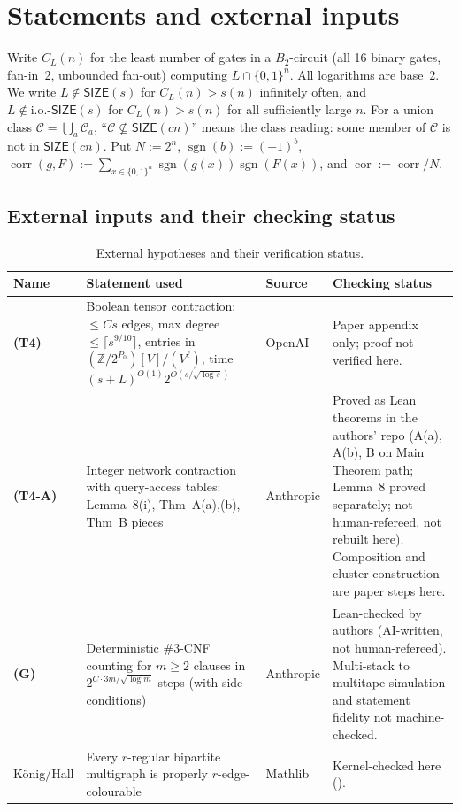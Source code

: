 \documentclass[11pt]{article}
\theoremstyle{definition}
\newcommand{\SIZE}{\mathsf{SIZE}}
\newcommand{\leanus}{\textunderscore\allowbreak}
\newcommand{\lean}[1]{\ifmmode\text{\ttfamily #1}\else{\ttfamily\let\_\leanus #1}\fi}
\begin{document}
\section{Statements and external inputs}\label{sec:statements}

Write $C_L(n)$ for the least number of gates in a $B_2$-circuit (all 16 binary gates, fan-in~2, unbounded fan-out) computing $L\cap\{0,1\}^n$. All logarithms are base~2. We write $L\notin\SIZE(s)$ for $C_L(n)>s(n)$ infinitely often, and $L\notin\mathrm{i.o.}\text{-}\SIZE(s)$ for $C_L(n)>s(n)$ for all sufficiently large $n$. For a union class $\mathcal{C}=\bigcup_a \mathcal{C}_a$, ``$\mathcal{C}\not\subseteq\SIZE(cn)$'' means the class reading: some member of $\mathcal{C}$ is not in $\SIZE(cn)$. Put $N:=2^n$, $\operatorname{sgn}(b):=(-1)^b$, $\operatorname{corr}(g,F):=\sum_{x\in\{0,1\}^n}\operatorname{sgn}(g(x))\operatorname{sgn}(F(x))$, and $\operatorname{cor}:=\operatorname{corr}/N$.

\subsection{External inputs and their checking status}

\begin{table}[h]
\centering
\small
\begin{tabular}{@{}>{\raggedright\arraybackslash}p{}>{\raggedright\arraybackslash}p{}>{\raggedright\arraybackslash}p{}>{\raggedright\arraybackslash}p{}@{}}
\toprule
Name & Statement used & Source & Checking status \\
\midrule
\textbf{(T4)} & Boolean tensor contraction: $\le Cs$ edges, max degree $\le\lceil s^{9/10}\rceil$, entries in $(\mathbb{Z}/2^{P_0})[V]/(V^\ell)$, time $(s+L)^{O(1)}2^{O(s/\sqrt{\log s})}$ & OpenAI \cite[Thm~D.1]{OAI26} & Paper appendix only; proof not verified here. \\
\textbf{(T4-A)} & Integer network contraction with query-access tables: Lemma~8(i), Thm~A(a),(b), Thm~B pieces & Anthropic \cite{Ant26} & Proved as Lean theorems in the authors' repo (A(a), A(b), B on Main Theorem path; Lemma~8 proved separately; not human-refereed, not rebuilt here). Composition and cluster construction are paper steps here. \\
\textbf{(G)} & Deterministic $\#3$-CNF counting for $m\ge2$ clauses in $2^{C\cdot 3m/\sqrt{\log m}}$ steps (with side conditions) & Anthropic \cite[Main Thm]{Ant26} & Lean-checked by authors (AI-written, not human-refereed). Multi-stack to multitape simulation and statement fidelity not machine-checked. \\
K\"onig/Hall & Every $r$-regular bipartite multigraph is properly $r$-edge-colourable & Mathlib & Kernel-checked here (\lean{regular\_bipartite\_coloring}). \\
\bottomrule
\end{tabular}
\caption{External hypotheses and their verification status.}\label{tab:inputs}
\end{table}
\end{document}
